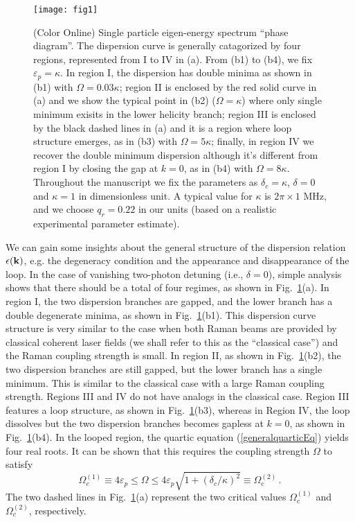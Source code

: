 \documentclass[atoms,article,submit,moreauthors,pdftex,12pt,a4paper]{mdpi}
\begin{document}
\begin{figure}[htp]
\texttt{[image: fig1]}\caption{ (Color Online) Single particle eigen-energy spectrum ``phase diagram''.  The dispersion curve is generally catagorized by four regions, represented from I to IV in (a). From (b1) to (b4), we fix $\varepsilon_p=\kappa$. In region I, the dispersion has double minima as shown in (b1) with $\Omega=0.03\kappa$; region II is enclosed by the red solid curve in (a) and we show the typical point in (b2) ($\Omega=\kappa$) where only single minimum exisits in the lower helicity branch; region III is enclosed by the black dashed lines in (a) and it is a region where loop structure emerges, as in (b3) with $\Omega=5\kappa$; finally, in region IV we recover the double minimum dispersion although it's different from region I by closing the gap at $k=0$, as in (b4) with $\Omega=8\kappa$.  Throughout the manuscript we fix the parameters as  $\delta_c=\kappa$, $\delta=0$ and $\kappa=1$ in dimensionless unit. A typical value for $\kappa$ is $2\pi \times 1 \text{ MHz}$, and we choose $q_r = 0.22$ in our units (based on a realistic experimental parameter estimate). }\label{fig1}
\end{figure}

We can gain some insights about the general structure of the dispersion relation $\epsilon({\bf k})$, e.g. the degeneracy condition and the appearance and disappearance of the loop. In the case of vanishing two-photon detuning (i.e., $\delta=0$),
simple analysis shows that there should be a total of four regimes, as shown in Fig.~\ref{fig1}(a). In region I, the two dispersion branches are gapped, and the lower branch has a double degenerate minima, as shown in Fig.~\ref{fig1}(b1). This dispersion curve structure is very similar to the case when both Raman beams are provided by classical coherent laser fields (we shall refer to this as the ``classical case'') and the Raman coupling strength is small. In region II, as shown in Fig.~\ref{fig1}(b2), the two dispersion branches are still gapped, but the lower branch has a single minimum. This is similar to the classical case with a large Raman coupling strength. Regions III and IV do not have analogs in the classical case. Region III features a loop structure, as shown in Fig.~\ref{fig1}(b3), whereas in Region IV, the loop dissolves but the two dispersion branches becomes gapless at $k=0$, as shown in Fig.~\ref{fig1}(b4). In the looped region, the quartic equation (\ref{generalquarticEq}) yields four real roots. It can be shown \cite{cavitySOC} that this requires the coupling strength $\Omega$ to satisfy
\[\Omega_c^{(1)}\equiv4\varepsilon_p\leq \Omega \leq  4\varepsilon_p \sqrt{1+(\delta_c/\kappa)^2}\equiv\Omega_c^{(2)} \,.\]
The two dashed lines in Fig.~\ref{fig1}(a) represent the two critical values $\Omega_c^{(1)}$ and $\Omega_c^{(2)}$, respectively.
\end{document}
